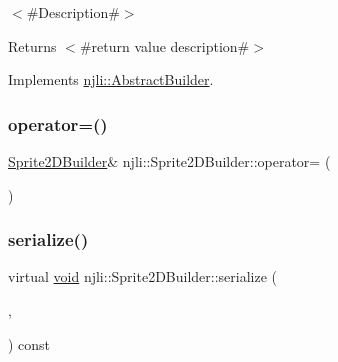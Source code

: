 $<$\#\+Description\#$>$

\begin{DoxyReturn}{Returns}
$<$\#return value description\#$>$ 
\end{DoxyReturn}


Implements \mbox{\hyperlink{classnjli_1_1_abstract_builder_a3e6e553e06d1ca30517ad5fb0bd4d000}{njli\+::\+Abstract\+Builder}}.

\mbox{\label{classnjli_1_1_sprite2_d_builder_a22eb97bc2d4dc995d5a7c0269da32ac4}} 
\subsubsection{\texorpdfstring{operator=()}{operator=()}}
{\footnotesize\ttfamily \mbox{\hyperlink{classnjli_1_1_sprite2_d_builder}{Sprite2\+D\+Builder}}\& njli\+::\+Sprite2\+D\+Builder\+::operator= (\begin{DoxyParamCaption}\item[{const \mbox{\hyperlink{classnjli_1_1_sprite2_d_builder}{Sprite2\+D\+Builder}} \&}]{ }\end{DoxyParamCaption})\hspace{0.3cm}{\ttfamily [protected]}}

\mbox{\label{classnjli_1_1_sprite2_d_builder_a22b346d352d04147e8341b16a012ae0b}} 
\subsubsection{\texorpdfstring{serialize()}{serialize()}}
{\footnotesize\ttfamily virtual \mbox{\hyperlink{_thread_8h_af1e856da2e658414cb2456cb6f7ebc66}{void}} njli\+::\+Sprite2\+D\+Builder\+::serialize (\begin{DoxyParamCaption}\item[{\mbox{\hyperlink{_thread_8h_af1e856da2e658414cb2456cb6f7ebc66}{void}} $\ast$}]{,  }\item[{bt\+Serializer $\ast$}]{ }\end{DoxyParamCaption}) const\hspace{0.3cm}{\ttfamily [virtual]}}

